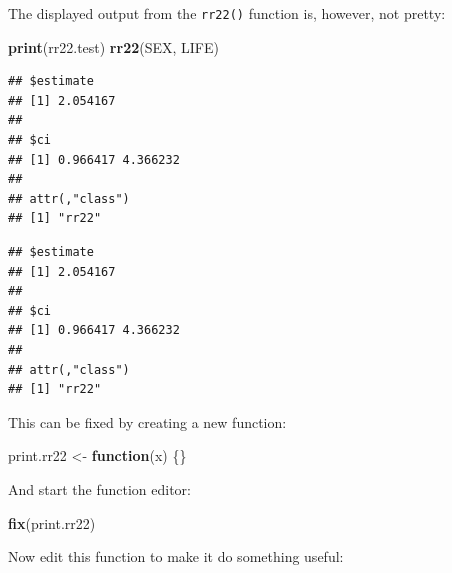 \documentclass[]{book}
\newenvironment{Shaded}{\begin{snugshade}}{\end{snugshade}}
\newcommand{\KeywordTok}[1]{\textcolor[rgb]{0.13,0.29,0.53}{\textbf{#1}}}
\newcommand{\DataTypeTok}[1]{\textcolor[rgb]{0.13,0.29,0.53}{#1}}
\newcommand{\DecValTok}[1]{\textcolor[rgb]{0.00,0.00,0.81}{#1}}
\newcommand{\CharTok}[1]{\textcolor[rgb]{0.31,0.60,0.02}{#1}}
\newcommand{\StringTok}[1]{\textcolor[rgb]{0.31,0.60,0.02}{#1}}
\newcommand{\ControlFlowTok}[1]{\textcolor[rgb]{0.13,0.29,0.53}{\textbf{#1}}}
\newcommand{\OperatorTok}[1]{\textcolor[rgb]{0.81,0.36,0.00}{\textbf{#1}}}
\newcommand{\NormalTok}[1]{#1}
\theoremstyle{definition}
\theoremstyle{definition}
\theoremstyle{definition}
\theoremstyle{remark}
\begin{document}
The displayed output from the \texttt{rr22()} function is, however, not
pretty:

\begin{Shaded}
\begin{Highlighting}[]
\KeywordTok{print}\NormalTok{(rr22.test)}
\KeywordTok{rr22}\NormalTok{(SEX, LIFE)}
\end{Highlighting}
\end{Shaded}

\begin{verbatim}
## $estimate
## [1] 2.054167
## 
## $ci
## [1] 0.966417 4.366232
## 
## attr(,"class")
## [1] "rr22"
\end{verbatim}

\begin{verbatim}
## $estimate
## [1] 2.054167
## 
## $ci
## [1] 0.966417 4.366232
## 
## attr(,"class")
## [1] "rr22"
\end{verbatim}

This can be fixed by creating a new function:

\begin{Shaded}
\begin{Highlighting}[]
\NormalTok{print.rr22 <-}\StringTok{ }\ControlFlowTok{function}\NormalTok{(x) \{\}}
\end{Highlighting}
\end{Shaded}

And start the function editor:

\begin{Shaded}
\begin{Highlighting}[]
\KeywordTok{fix}\NormalTok{(print.rr22)}
\end{Highlighting}
\end{Shaded}

Now edit this function to make it do something useful:

\begin{Shaded}
\end{Shaded}
\end{document}
